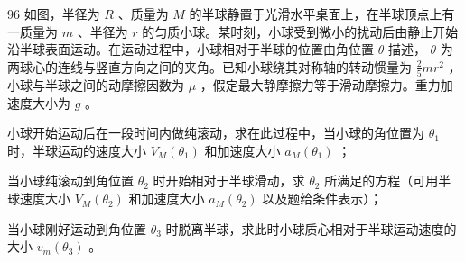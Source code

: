 \begin{problem}[第35届全国中学生物理竞赛决赛][半球与小球动力学]{96}
    如图，半径为 $R$ 、质量为 $M$ 的半球静置于光滑水平桌面上，在半球顶点上有一质量为 $m$ 、半径为 $r$ 的匀质小球。某时刻，小球受到微小的扰动后由静止开始沿半球表面运动。在运动过程中，小球相对于半球的位置由角位置 $\theta$ 描述， $\theta$ 为两球心的连线与竖直方向之间的夹角。已知小球绕其对称轴的转动惯量为 $\frac{2}{5} mr^2$ ，小球与半球之间的动摩擦因数为 $\mu$ ，假定最大静摩擦力等于滑动摩擦力。重力加速度大小为 $g$ 。
    \begin{subproblem}
        小球开始运动后在一段时间内做纯滚动，求在此过程中，当小球的角位置为 $\theta_{1}$ 时，半球运动的速度大小 $V_{M}(\theta_{1})$ 和加速度大小 $a_{M}(\theta_{1})$ ；
    \end{subproblem}
    \begin{subproblem}
        当小球纯滚动到角位置 $\theta_{2}$ 时开始相对于半球滑动，求 $\theta_{2}$ 所满足的方程（可用半球速度大小 $V_{M}\left(\theta_{2}\right)$ 和加速度大小 $a_{M}\left(\theta_{2}\right)$ 以及题给条件表示）；
    \end{subproblem}
    \begin{subproblem}
        当小球刚好运动到角位置 $\theta_{3}$ 时脱离半球，求此时小球质心相对于半球运动速度的大小 $v_{m}(\theta_{3})$ 。
    \end{subproblem}
\end{problem}